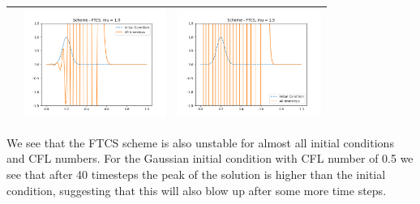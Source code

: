 \documentclass[a4paper,twoside,11pt]{article}
\begin{document}
\begin{table}[!h]
\begin{tabular}{ | c | m{5cm} | m{5cm} | }
\begin{minipage}{.3\textwidth}
        \end{minipage}
        &
        \begin{minipage}{.3\textwidth}
          \includegraphics[width=\linewidth, height=3.5cm]{../plots/scheme2-IC5-mu1_0.png}
        \end{minipage}
        &
        \begin{minipage}{.3\textwidth}
          \includegraphics[width=\linewidth, height=3.5cm]{../plots/scheme2-IC5-mu1_5.png}
        \end{minipage} \\
        \hline
      \end{tabular}
    \end{table}

    We see that the FTCS scheme is also unstable for almost all initial conditions and CFL numbers. For the Gaussian initial condition with CFL number of 0.5 we see that after 40 timesteps the peak of the solution is higher than the initial condition, suggesting that this will also blow up after some more time steps.

    \newpage
\end{document}
